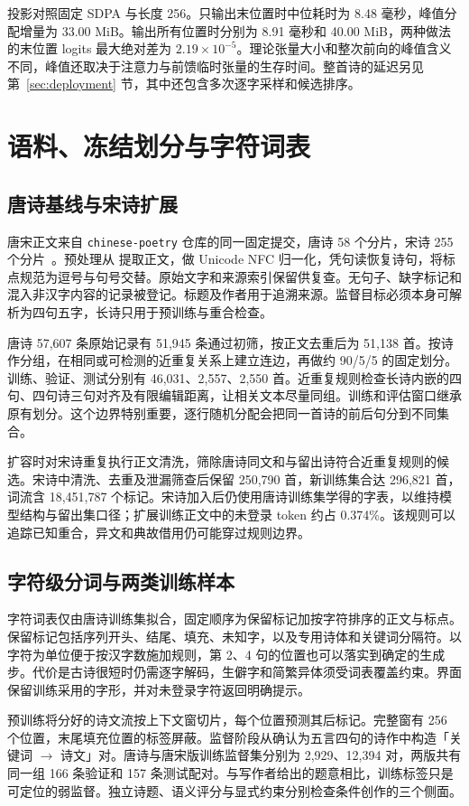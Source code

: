 投影对照固定 SDPA 与长度 256。只输出末位置时中位耗时为 8.48 毫秒，峰值分配增量为 33.00 MiB。输出所有位置时分别为 8.91 毫秒和 40.00 MiB，两种做法的末位置 logits 最大绝对差为 $2.19\times10^{-5}$。理论张量大小和整次前向的峰值含义不同，峰值还取决于注意力与前馈临时张量的生存时间。整首诗的延迟另见第~\ref{sec:deployment} 节，其中还包含多次逐字采样和候选排序。

\section{语料、冻结划分与字符词表}
\label{sec:corpus}

\subsection{唐诗基线与宋诗扩展}

唐宋正文来自 \texttt{chinese-poetry} 仓库的同一固定提交，唐诗 58 个分片，宋诗 255 个分片~\cite{chinesepoetry}。预处理从  提取正文，做 Unicode NFC 归一化，凭句读恢复诗句，将标点规范为逗号与句号交替。原始文字和来源索引保留供复查。无句子、缺字标记和混入非汉字内容的记录被登记。标题及作者用于追溯来源。监督目标必须本身可解析为四句五字，长诗只用于预训练与重合检查。

唐诗 57,607 条原始记录有 51,945 条通过初筛，按正文去重后为 51,138 首。按诗作分组，在相同或可检测的近重复关系上建立连边，再做约 90/5/5 的固定划分。训练、验证、测试分别有 46,031、2,557、2,550 首。近重复规则检查长诗内嵌的四句、四句诗三句对齐及有限编辑距离，让相关文本尽量同组。训练和评估窗口继承原有划分。这个边界特别重要，逐行随机分配会把同一首诗的前后句分到不同集合。


扩容时对宋诗重复执行正文清洗，筛除唐诗同文和与留出诗符合近重复规则的候选。宋诗中清洗、去重及泄漏筛查后保留 250,790 首，新训练集合达 296,821 首，词流含 18,451,787 个标记。宋诗加入后仍使用唐诗训练集学得的字表，以维持模型结构与留出集口径；扩展训练正文中的未登录 token 约占 0.374\%。该规则可以追踪已知重合，异文和典故借用仍可能穿过规则边界。

\subsection{字符级分词与两类训练样本}

字符词表仅由唐诗训练集拟合，固定顺序为保留标记加按字符排序的正文与标点。保留标记包括序列开头、结尾、填充、未知字，以及专用诗体和关键词分隔符。以字符为单位便于按汉字数施加规则，第 2、4 句的位置也可以落实到确定的生成步。代价是古诗很短时仍需逐字解码，生僻字和简繁异体须受词表覆盖约束。界面保留训练采用的字形，并对未登录字符返回明确提示。

预训练将分好的诗文流按上下文窗切片，每个位置预测其后标记。完整窗有 256 个位置，末尾填充位置的标签屏蔽。监督阶段从确认为五言四句的诗作中构造「关键词 $\to$ 诗文」对。唐诗与唐宋版训练监督集分别为 2,929、12,394 对，两版共有同一组 166 条验证和 157 条测试配对。与写作者给出的题意相比，训练标签只是可定位的弱监督。独立诗题、语义评分与显式约束分别检查条件创作的三个侧面。
